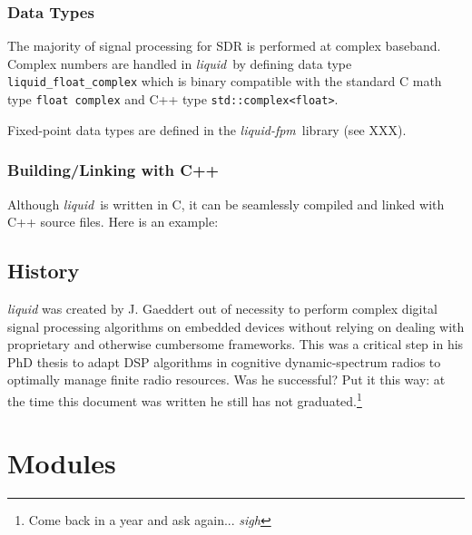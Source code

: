 \documentclass[11pt,twoside]{report}
\newcommand{\liquid}{{\it liquid}}
\newcommand{\liquidfpm}{{\it liquid-fpm}}
\begin{document}
\subsection{Data Types}
The majority of signal processing for SDR is performed at complex baseband.
Complex numbers are handled in \liquid\ by defining data type
{\tt liquid\_float\_complex} which is binary compatible with the standard
C math type {\tt float complex} and C++ type {\tt std::complex<float>}.

Fixed-point data types are defined in the \liquidfpm\ library (see XXX).

\subsection{Building/Linking with C++}
Although \liquid\ is written in C, it can be seamlessly compiled and linked
with C++ source files.
Here is an example:


\section{History}
{\em liquid} was created by J. Gaeddert out of necessity to perform complex
digital signal processing algorithms on embedded devices
without relying on dealing
with proprietary and otherwise cumbersome frameworks.
This was a critical step in his PhD thesis to adapt DSP algorithms in
cognitive dynamic-spectrum radios to optimally manage finite radio resources.
Was he successful?
Put it this way: at the time this document was written he still has not
graduated.\footnote{Come back in a year and ask again... {\em sigh}}

%
%
\chapter{Modules}
\label{ch:modules}























\end{document}

